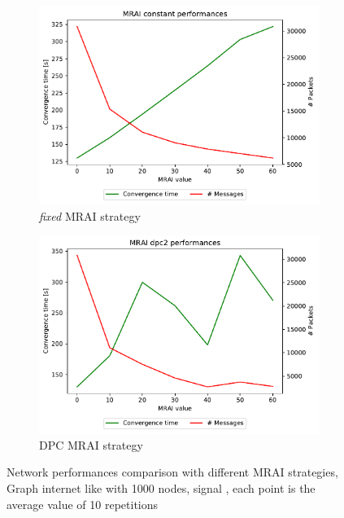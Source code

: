 \begin{figure}[h]
     \centering
     \begin{subfigure}[b]{0.49\textwidth}
         \centering
         \includegraphics[width=\textwidth]{images/internet_like/1000/signals/AWAWA/constant/internet_like-constant_AWAWA_mrai_evolution.pdf}
		 \caption{\textit{fixed} \ac{MRAI} strategy}
         \label{fig:internet_like_1000_fixed_AWAWA}
     \end{subfigure}
     \hfill
     \begin{subfigure}[b]{0.49\textwidth}
         \centering
         \includegraphics[width=\textwidth]{images/internet_like/1000/signals/AWAWA/dpc/internet_like-DPC_AWAWA_mrai_evolution.pdf}
		 \caption{\ac{DPC} \ac{MRAI} strategy}
         \label{fig:internet_like_1000_dpc_AWAWA}
     \end{subfigure}
	 \caption{Network performances comparison with different \ac{MRAI} strategies,
		Graph internet like with \num{1000} nodes, signal , each point is
		the average value of \num{10} repetitions
		}
        \label{fig:internt_like_1000_evolution_AWAWA}
\end{figure}

